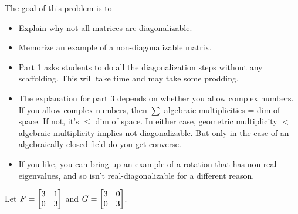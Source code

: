 \documentclass{problemset}
\begin{document}
	\question
	\begin{annotation}
		\begin{goals}

			The goal of this problem is to
			\begin{itemize}
				\item Explain why not all matrices are diagonalizable.
				\item Memorize an example of a non-diagonalizable matrix.
			\end{itemize}
		\end{goals}

		\begin{notes}
			\begin{itemize}
				\item Part 1 asks students to do all the diagonalization steps
					without any scaffolding. This will take time and may take
					some prodding.
				\item The explanation for part 3 depends on whether you allow complex numbers.
					If you allow complex numbers, then $\sum$ algebraic multiplicities = dim
					of space. If not, it's $\leq$ dim of space. In either case, geometric
					multiplicity $<$ algebraic multiplicity implies not diagonalizable. 
					But only in the case of an algebraically closed field do you get
					converse.
				\item If you like, you can bring up an example of a rotation that has non-real
					eigenvalues, and so isn't real-diagonalizable for a different reason.
			\end{itemize}
		\end{notes}
	\end{annotation}
	Let $F=\mat{3&1\\0&3}$ and $G=\mat{3&0\\0&3}$.
\end{document}
